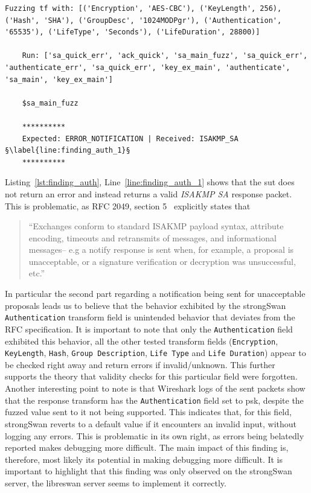 \begin{lstlisting}[float=h, caption=Discovered finding showing the Authentication field not being validated., label=lst:finding_auth, escapechar=§]
	Fuzzing tf with: [('Encryption', 'AES-CBC'), ('KeyLength', 256), ('Hash', 'SHA'), ('GroupDesc', '1024MODPgr'), ('Authentication', '65535'), ('LifeType', 'Seconds'), ('LifeDuration', 28800)]
	
	Run: ['sa_quick_err', 'ack_quick', 'sa_main_fuzz', 'sa_quick_err', 'authenticate_err', 'sa_quick_err', 'key_ex_main', 'authenticate', 'sa_main', 'key_ex_main']
	
	$sa_main_fuzz

	**********
	Expected: ERROR_NOTIFICATION | Received: ISAKMP_SA §\label{line:finding_auth_1}§
	**********
\end{lstlisting}

\newpage
Listing~\ref{lst:finding_auth}, Line~\ref{line:finding_auth_1} shows that the \ac{sut} does not return an error and instead returns a valid \emph{ISAKMP SA} response packet. This is problematic, as RFC 2049, section 5~\cite{rfc:ikev1} explicitly states that 

\begin{quotation}
	``Exchanges conform to standard ISAKMP payload syntax, attribute
	encoding, timeouts and retransmits of messages, and informational
	messages-- e.g a notify response is sent when, for example, a
	proposal is unacceptable, or a signature verification or decryption
	was unsuccessful, etc.''
\end{quotation}

In particular the second part regarding a notification being sent for unacceptable proposals leads us to believe that the behavior exhibited by the strongSwan \texttt{Authentication} transform field is unintended behavior that deviates from the RFC specification. It is important to note that only the \texttt{Authentication} field exhibited this behavior, all the other tested transform fields (\texttt{Encryption}, \texttt{KeyLength}, \texttt{Hash}, \texttt{Group Description}, \texttt{Life Type} and \texttt{Life Duration}) appear to be checked right away and return errors if invalid/unknown. This further supports the theory that validity checks for this particular field were forgotten. Another interesting point to note is that Wireshark logs of the sent packets show that the response transform has the \texttt{Authentication} field set to \ac{psk}, despite the fuzzed value sent to it not being supported. This indicates that, for this field, strongSwan reverts to a default value if it encounters an invalid input, without logging any errors. This is problematic in its own right, as errors being belatedly reported makes debugging more difficult. The main impact of this finding is, therefore, most likely its potential in making debugging more difficult. It is important to highlight that this finding was only observed on the strongSwan server, the libreswan server seems to implement it correctly. \\

